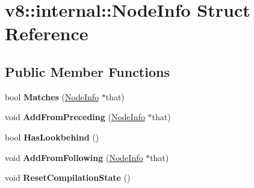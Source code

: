 \hypertarget{structv8_1_1internal_1_1_node_info}{}\section{v8\+:\+:internal\+:\+:Node\+Info Struct Reference}
\label{structv8_1_1internal_1_1_node_info}
\subsection*{Public Member Functions}
\begin{DoxyCompactItemize}
\item 
bool {\bfseries Matches} (\hyperlink{structv8_1_1internal_1_1_node_info}{Node\+Info} $\ast$that)\hypertarget{structv8_1_1internal_1_1_node_info_af4bd1340f0fdd6223ad65b0a9ed00ebe}{}\label{structv8_1_1internal_1_1_node_info_af4bd1340f0fdd6223ad65b0a9ed00ebe}

\item 
void {\bfseries Add\+From\+Preceding} (\hyperlink{structv8_1_1internal_1_1_node_info}{Node\+Info} $\ast$that)\hypertarget{structv8_1_1internal_1_1_node_info_ae61bab54bf13eb31bd647c6e3a361a58}{}\label{structv8_1_1internal_1_1_node_info_ae61bab54bf13eb31bd647c6e3a361a58}

\item 
bool {\bfseries Has\+Lookbehind} ()\hypertarget{structv8_1_1internal_1_1_node_info_a38e5726083c41a3b94f336e9c003da02}{}\label{structv8_1_1internal_1_1_node_info_a38e5726083c41a3b94f336e9c003da02}

\item 
void {\bfseries Add\+From\+Following} (\hyperlink{structv8_1_1internal_1_1_node_info}{Node\+Info} $\ast$that)\hypertarget{structv8_1_1internal_1_1_node_info_a074b23d256b33ea95eb8b33332a357b6}{}\label{structv8_1_1internal_1_1_node_info_a074b23d256b33ea95eb8b33332a357b6}

\item 
void {\bfseries Reset\+Compilation\+State} ()\hypertarget{structv8_1_1internal_1_1_node_info_a9de3bfee1c5a9f3628a1e982ba55c1ce}{}\label{structv8_1_1internal_1_1_node_info_a9de3bfee1c5a9f3628a1e982ba55c1ce}

\end{DoxyCompactItemize}

